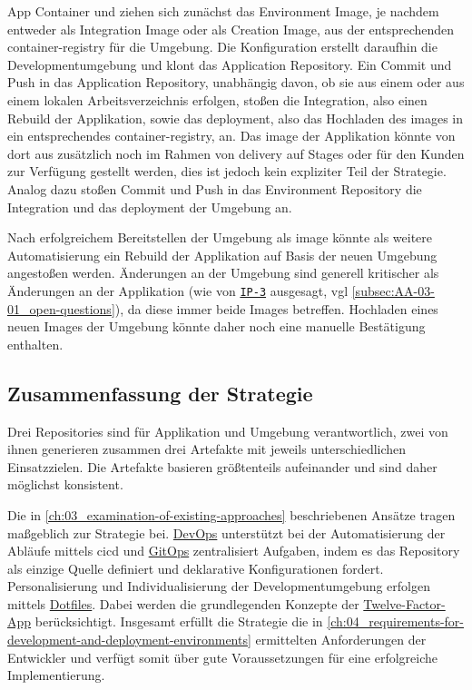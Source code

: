 App Container und   ziehen sich zunächst das Environment Image, je nachdem entweder als Integration Image oder als Creation Image, aus der entsprechenden \Gls{container-registry} für die Umgebung. Die  Konfiguration erstellt daraufhin die Developmentumgebung und  klont das Application Repository. Ein  Commit und Push in das Application Repository, unabhängig davon, ob sie aus einem  oder aus einem lokalen Arbeitsverzeichnis erfolgen, stoßen  die Integration, also einen Rebuild der Applikation, sowie  das \Gls{deployment}, also das Hochladen des \Glspl{image} in ein entsprechendes \Gls{container-registry}, an. Das \Gls{image} der Applikation könnte von dort aus zusätzlich noch im Rahmen von \Gls{delivery} auf Stages oder für den Kunden zur Verfügung gestellt werden, dies ist jedoch kein expliziter Teil der  Strategie. Analog dazu stoßen  Commit und Push in das Environment Repository  die Integration und  das \Gls{deployment} der Umgebung an.

Nach erfolgreichem Bereitstellen der Umgebung als \Gls{image} könnte als weitere Automatisierung ein Rebuild der Applikation auf Basis der neuen Umgebung angestoßen werden. Änderungen an der Umgebung sind generell kritischer als Änderungen an der Applikation (wie von \texttt{\hyperref[sec:AA-02_interview-persons]{IP-3}} ausgesagt, \acrshort{vgl} \autoref{subsec:AA-03-01_open-questions}), da diese immer beide Images betreffen. Hochladen eines neuen Images der Umgebung könnte daher noch eine manuelle Bestätigung enthalten. 

\subsection{Zusammenfassung der Strategie}
\label{subsec:05-02-04_summary-of-strategy}

Drei Repositories sind für Applikation und Umgebung verantwortlich, zwei von ihnen generieren zusammen drei Artefakte mit jeweils unterschiedlichen Einsatzzielen. Die Artefakte basieren größtenteils aufeinander und sind daher möglichst konsistent.

Die in \autoref{ch:03_examination-of-existing-approaches} beschriebenen Ansätze tragen maßgeblich zur  Strategie bei. \hyperref[sec:03-01_devops]{DevOps} unterstützt bei der Automatisierung der Abläufe mittels \Gls{cicd} und \hyperref[sec:03-03_gitops]{GitOps} zentralisiert Aufgaben, indem es das Repository als einzige Quelle definiert und deklarative Konfigurationen fordert. Personalisierung und Individualisierung der Developmentumgebung erfolgen mittels \hyperref[sec:03-04_dotfiles]{Dotfiles}. Dabei werden die grundlegenden Konzepte der \hyperref[sec:03-05_concept-of-twelve-factor-app]{Twelve-Factor-App} berücksichtigt. Insgesamt erfüllt die Strategie die in \autoref{ch:04_requirements-for-development-and-deployment-environments} ermittelten Anforderungen der Entwickler und verfügt somit über gute Voraussetzungen für eine erfolgreiche Implementierung.

